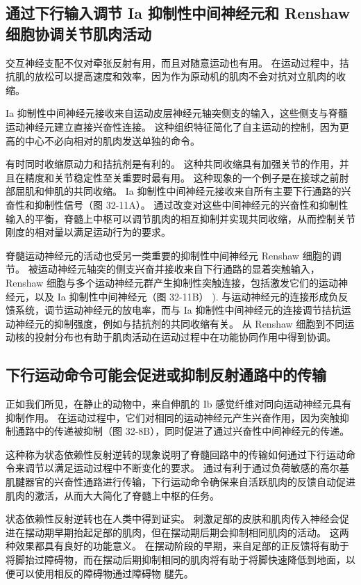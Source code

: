\subsection{通过下行输入调节 Ia 抑制性中间神经元和 Renshaw 细胞协调关节肌肉活动}
交互神经支配不仅对牵张反射有用，而且对随意运动也有用。 在运动过程中，拮抗肌的放松可以提高速度和效率，因为作为原动机的肌肉不会对抗对立肌肉的收缩。

Ia 抑制性中间神经元接收来自运动皮层神经元轴突侧支的输入，这些侧支与脊髓运动神经元建立直接兴奋性连接。 这种组织特征简化了自主运动的控制，因为更高的中心不必向相对的肌肉发送单独的命令。

有时同时收缩原动力和拮抗剂是有利的。 这种共同收缩具有加强关节的作用，并且在精度和关节稳定性至关重要时最有用。 这种现象的一个例子是在接球之前肘部屈肌和伸肌的共同收缩。 Ia 抑制性中间神经元接收来自所有主要下行通路的兴奋性和抑制性信号（图 32-11A）。 通过改变对这些中间神经元的兴奋性和抑制性输入的平衡，脊髓上中枢可以调节肌肉的相互抑制并实现共同收缩，从而控制关节刚度的相对量以满足运动行为的要求。

脊髓运动神经元的活动也受另一类重要的抑制性中间神经元 Renshaw 细胞的调节。 被运动神经元轴突的侧支兴奋并接收来自下行通路的显着突触输入，Renshaw 细胞与多个运动神经元群产生抑制性突触连接，包括激发它们的运动神经元，以及 Ia 抑制性中间神经元（图 32-11B） ). 与运动神经元的连接形成负反馈系统，调节运动神经元的放电率，而与 Ia 抑制性中间神经元的连接调节拮抗运动神经元的抑制强度，例如与拮抗剂的共同收缩有关。 从 Renshaw 细胞到不同运动核的投射分布也有助于肌肉活动在运动过程中在功能协同作用中得到协调。


\subsection{下行运动命令可能会促进或抑制反射通路中的传输}
正如我们所见，在静止的动物中，来自伸肌的 Ib 感觉纤维对同向运动神经元具有抑制作用。 在运动过程中，它们对相同的运动神经元产生兴奋作用，因为突触抑制通路中的传递被抑制（图 32-8B），同时促进了通过兴奋性中间神经元的传递。

这种称为状态依赖性反射逆转的现象说明了脊髓回路中的传输如何通过下行运动命令来调节以满足运动过程中不断变化的要求。 通过有利于通过负荷敏感的高尔基肌腱器官的兴奋性通路进行传输，下行运动命令确保来自活跃肌肉的反馈自动促进肌肉的激活，从而大大简化了脊髓上中枢的任务。

状态依赖性反射逆转也在人类中得到证实。 刺激足部的皮肤和肌肉传入神经会促进在摆动期早期抬起足部的肌肉，但在摆动期后期会抑制相同肌肉的活动。 这两种效果都具有良好的功能意义。 在摆动阶段的早期，来自足部的正反馈将有助于将脚抬过障碍物，而在摆动后期抑制相同的肌肉将有助于将脚快速降低到地面，以便可以使用相反的障碍物通过障碍物 腿先。

